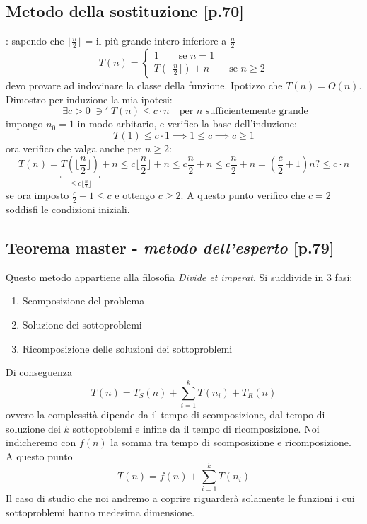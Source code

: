 \documentclass[italian]{article}
\newcommand{\dateright}[1]{\normalfont{\normalsize{\hfill #1 \\}}}
\newcommand{\taleche}{\;\ni'\;}
\newcommand{\varOmicron}{O}
\newcommand{\fn}{f(n)}
\let\oldexists\exists
\renewcommand{\exists}{\text{$\;\oldexists$}}
\newcommand{\example}{\text{\faCircleArrowRight $\;$ Esempio }}
\newcommand{\isLeq}{?\leq}
\begin{document}
\pagebreak
\subsection{Metodo della sostituzione [p.70]}
\dateright{12 Ottobre 2016}
\example: sapendo che $\lfloor \frac{n}{2} \rfloor$ = il più grande intero inferiore a $\frac{n}{2}$
\[
	T(n) = 
	\begin{cases*}
		1 \qquad \text{se } n=1 \\
		T\left( \lfloor \frac{n}{2} \rfloor \right) + n \qquad \text{se } n \geq 2
	\end{cases*}
\]
devo provare ad indovinare la classe della funzione. Ipotizzo che $T(n) = \varOmicron(n)$. Dimostro per induzione la mia ipotesi:
\[
	\exists c > 0 \taleche T(n) \leq c\cdot n \quad \text{per $n$ sufficientemente grande}
\]
impongo $n_0 = 1$ in modo arbitario, e verifico la base dell'induzione:
\[
	T(1) \leq c\cdot 1 \implies 1 \leq c \implies c \geq 1
\]
ora verifico che valga anche per $n \geq 2$:
\[
	T(n) = 	\underbracket{T\left( \lfloor \frac{n}{2} \rfloor \right)}_{\leq c \lfloor \frac{n}{2} \rfloor} + n \leq c \lfloor \frac{n}{2} \rfloor + n \leq c\frac{n}{2} + n \leq c\frac{n}{2} + n = \left( \frac{c}{2} + 1 \right)n \isLeq c\cdot n
\]
se ora imposto $\frac{c}{2} + 1 \leq c$ e ottengo $c \geq 2$. A questo punto verifico che $c=2$ soddisfi le condizioni iniziali.

\subsection{Teorema master - \textit{metodo dell'esperto} [p.79]}
 \label{sec:masterTheorem}
Questo metodo appartiene alla filosofia \textit{Divide et imperat}. Si suddivide in 3 fasi:
\begin{enumerate}[label=\arabic*)]
	\item Scomposizione del problema
	\item Soluzione dei sottoproblemi
	\item Ricomposizione delle soluzioni dei sottoproblemi
\end{enumerate}
Di conseguenza
\[
	T(n) = T_S(n) + \sum_{i=1}^{k} T(n_i) + T_R(n)
\]
ovvero la complessità dipende da il tempo di scomposizione, dal tempo di soluzione dei $k$ sottoproblemi e infine da il tempo di ricomposizione. Noi indicheremo con $\fn$ la somma tra tempo di scomposizione e ricomposizione. A questo punto
\[
	T(n) = \fn + \sum_{i=1}^{k} T(n_i) 
\]
Il caso di studio che noi andremo a coprire riguarderà solamente le funzioni i cui sottoproblemi hanno medesima dimensione.
\pagebreak
\end{document}

